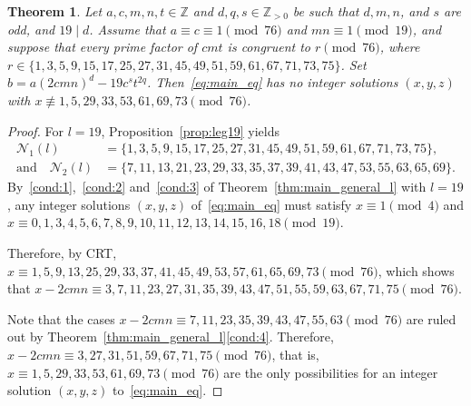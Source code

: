 \documentclass[11pt,a4paper]{amsart}
\newcommand{\ZZ}{\mathbb{Z}}
\theoremstyle{plain}
\newtheorem{theorem}{Theorem}[section]
\theoremstyle{definition}
\begin{document}
\begin{theorem}\label{thm:main19_gen}
Let $a, c, m, n, t \in \ZZ$ and $d, q, s \in \ZZ_{>0}$ be such that $d, m, n$, and $s$ are odd, and $19 \mid d$. Assume that $a \equiv c \equiv 1 \pmod{76}$ and $mn \equiv 1 \pmod{19}$, and suppose that every prime factor of $cmt$ is congruent to $r \pmod{76}$, where $r\in  \{1, 3, 5, 9, 15, 17, 25, 27, 31, \allowbreak  45, 49, 51, 59, 61, 67, 71, 73, 75\}$. Set $b = a  (2c m n)^d - 19c^s t^{2q}$. Then~\eqref{eq:main_eq} has no integer solutions $(x,y,z) $ with $x \not\equiv 1,5,29,33,53,61,69,73 \pmod{76}$.
\end{theorem}
\begin{proof}
For $l=19$, Proposition~\ref{prop:leg19} yields
\begin{align*}
    \mathcal{N}_1(l) &= \{1, 3, 5, 9, 15, 17, 25, 27, 31, 45, 49, 51, 59, 61, 67, 71, 73, 75\}, \\
    \text{and} \quad \mathcal{N}_2(l) &= \{7, 11, 13, 21, 23, 29, 33, 35, 37, 39, 41, 43, 47, 53, 55, 63, 65, 69\}.
\end{align*}
    By~\ref{cond:1},~\ref{cond:2} and~\ref{cond:3} of Theorem~\ref{thm:main_general_l} with $l=19$, any integer solutions $(x,y,z) $ of~\eqref{eq:main_eq} must satisfy $x \equiv 1 \pmod{4}$ and $x \equiv 0, 1, 3, 4, 5, 6, 7, 8, 9, 10, 11, 12, 13, 14, 15, 16, 18 \pmod{19}$.
    
Therefore, by CRT, $x \equiv 1, 5, 9, 13, 25, 29, 33, 37, 41, 45, 49, 53, 57, 61, 65, 69, 73 \pmod{76}$, which shows that $x-2cmn \equiv 3, 7, 11, 23, 27, 31, 35, 39, 43, 47, 51, 55, 59, 63, 67, 71, 75 \pmod{76}$.

Note that the cases $x - 2cmn \equiv 7, 11, 23, 35, 39, 43, 47, 55, 63 \pmod{76}$ are ruled out by Theorem~\ref{thm:main_general_l}\ref{cond:4}. Therefore, $x-2cmn \equiv 3, 27, 31, 51, 59, 67, 71, 75 \pmod{76}$, that is, $ x \equiv 1, 5, 29, 33, 53, 61, 69, 73 \pmod{76}$ are the only possibilities for an integer solution $(x,y,z)$ to~\eqref{eq:main_eq}.
\end{proof}
\end{document}
